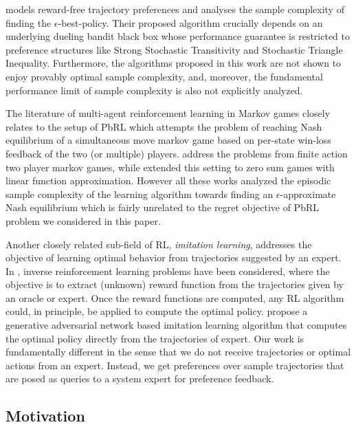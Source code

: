 \cite{xu20} models reward-free trajectory preferences and analyses the sample complexity of finding the $\epsilon$-best-policy. Their proposed algorithm crucially depends on an underlying dueling bandit black box whose performance guarantee is restricted to preference structures like Strong Stochastic Transitivity and Stochastic Triangle Inequality. Furthermore, the algorithms proposed in this work are not shown to enjoy provably optimal sample complexity, and, moreover, the fundamental performance limit of sample complexity is also not explicitly analyzed.

The literature of multi-agent reinforcement learning in Markov games closely relates to the setup of PbRL which attempts the problem of reaching Nash equilibrium of a simultaneous move markov game based on per-state win-loss feedback of the two (or multiple) players. \cite{bai20,bai+20,liu21} address the problems from finite action two player markov games, while \cite{xie+20} extended this setting to zero sum games with linear function approximation. However all these works analyzed the episodic sample complexity of the learning algorithm towards finding an $\epsilon$-approximate Nash equilibrium which is fairly unrelated to the regret objective of PbRL problem we considered in this paper. 

Another closely related sub-field of RL, \emph{imitation learning}, addresses the objective of learning optimal behavior from trajectories suggested by an expert. In \cite{ng2000algorithms,boularias2011relative,neu2012apprenticeship,wulfmeier2015maximum}, inverse reinforcement learning problems have been considered, where the objective is to extract (unknown) reward function from the trajectories given by an oracle or expert. Once the reward functions are computed, any RL algorithm could, in principle, be applied to compute the optimal policy. \citet{ho2016generative} propose a generative adversarial network based imitation learning algorithm that computes the optimal policy directly from the trajectories of expert. Our work is fundamentally different in the sense that we do not receive trajectories or optimal actions from an expert. Instead, we get preferences over sample trajectories that are posed as queries to a system expert for preference feedback. 

\iffalse 
\subsection{Motivation}

